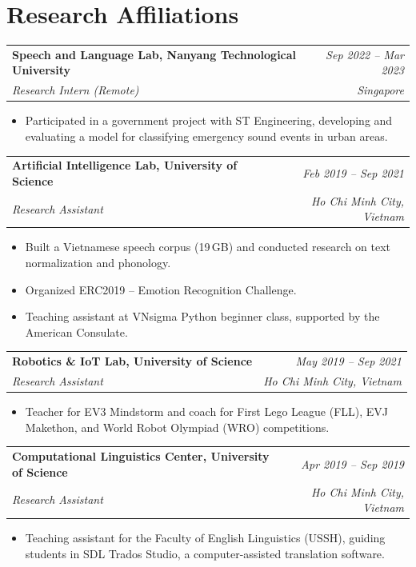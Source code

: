 \documentclass[10pt,a4paper]{article}
\makeatletter
\newcommand{\cventry}[4]{%
  \noindent
  \begin{tabular*}{\linewidth}{@{}l@{\extracolsep{\fill}}r@{}}
    {\color{accent}\textbf{#1}} & \textit{\small #2} \\
    \textit{\small #3} & \textit{\small #4}
  \end{tabular*}%
  \vspace{1pt}%
}
\makeatother
\begin{document}
\section{Research Affiliations}

\cventry{Speech and Language Lab, Nanyang Technological University}{Sep 2022 -- Mar 2023}
        {Research Intern (Remote)}{Singapore}
\begin{itemize}
  \item Participated in a government project with ST Engineering, developing and evaluating a model for classifying emergency sound events in urban areas.
\end{itemize}

\vspace{3pt}
\cventry{Artificial Intelligence Lab, University of Science}{Feb 2019 -- Sep 2021}
        {Research Assistant}{Ho Chi Minh City, Vietnam}
\begin{itemize}
  \item Built a Vietnamese speech corpus (19\,GB) and conducted research on text normalization and phonology.
  \item Organized ERC2019 -- Emotion Recognition Challenge.
  \item Teaching assistant at VNsigma Python beginner class, supported by the American Consulate.
\end{itemize}

\vspace{3pt}
\cventry{Robotics \& IoT Lab, University of Science}{May 2019 -- Sep 2021}
        {Research Assistant}{Ho Chi Minh City, Vietnam}
\begin{itemize}
  \item Teacher for EV3 Mindstorm and coach for First Lego League (FLL), EVJ Makethon, and World Robot Olympiad (WRO) competitions.
\end{itemize}

\vspace{3pt}
\cventry{Computational Linguistics Center, University of Science}{Apr 2019 -- Sep 2019}
        {Research Assistant}{Ho Chi Minh City, Vietnam}
\begin{itemize}
  \item Teaching assistant for the Faculty of English Linguistics (USSH), guiding students in SDL Trados Studio, a computer-assisted translation software.
\end{itemize}

\end{document}
